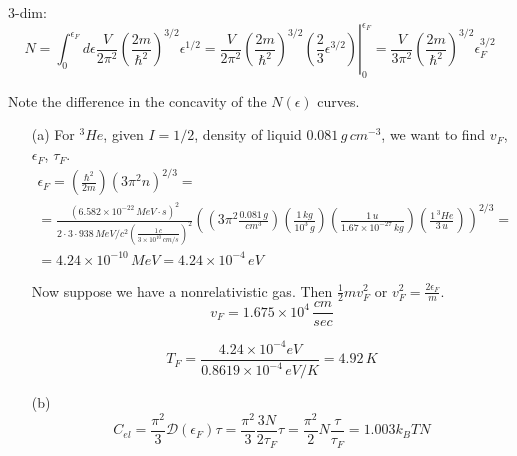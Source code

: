 \documentclass[twoside]{amsart}
\theoremstyle{plain}
\theoremstyle{definition}
\newcommand{\solutionhead}[1]
  {
   \noindent{\small\bf Solution #1.}
   }
\begin{document}
3-dim:
\[
N = \int_0^{\epsilon_F} d\epsilon \frac{V}{2\pi^2} \left( \frac{2m}{ \hbar^2} \right)^{3/2} \epsilon^{1/2} = \left. \frac{V}{2\pi^2} \left( \frac{2m}{ \hbar^2} \right)^{3/2} \left( \frac{2}{3} \epsilon^{3/2} \right) \right|_0^{\epsilon_F} = \frac{V}{3\pi^2} \left( \frac{2m}{ \hbar^2 }\right)^{3/2} \epsilon_F^{3/2}
\]

Note the difference in the concavity of the $N(\epsilon)$ curves.

\solutionhead{5}
\begin{itemize}
\item[(a)] For $^{3}He$, given $I = 1/2$, density of liquid $0.081 \, g \, cm^{-3}$, we want to find $v_F$, $\epsilon_F$, $\tau_F$.  
\[
\begin{gathered}
  \epsilon_F = \left( \frac{ \hbar^2}{ 2m} \right) (3\pi^2 n)^{2/3} = \\
  = \frac{ (6.582 \times 10^{-22} \, MeV \cdot s )^2 }{ 2 \cdot 3 \cdot 938 \, MeV/c^2 \left( \frac{1 \, c}{ 3\times 10^{10} \, cm/s } \right)^2 } \left( \left( 3 \pi^2 \frac{ 0.081 \, g }{cm^3} \right) \left( \frac{1 \, kg}{ 10^3 \, g} \right) \left( \frac{1 \, u }{ 1.67 \times 10^{-27} \, kg } \right) \left( \frac{ 1 \, ^{3}He}{ 3 \, u } \right) \right)^{2/3} = \\
  = 4.24 \times 10^{-10} \, MeV = 4.24 \times 10^{-4} \, eV
\end{gathered}
\]

Now suppose we have a nonrelativistic gas.  Then $\frac{1}{2} m v_F^2$ or $v_F^2 = \frac{2\epsilon_F}{m}$.
\[
v_F = 1.675 \times 10^4 \, \frac{cm}{sec}
\]

\[
T_F  = \frac{4.24 \times 10^{-4 } eV}{ 0.8619 \times 10^{-4} \, eV/K } = 4.92 \, K
\]
\item[(b)] 
\[
C_{el} = \frac{\pi^2}{3} \mathcal{D}(\epsilon_F)\tau = \frac{\pi^2}{3} \frac{3N}{2\tau_F} \tau = \frac{\pi^2}{2} N \frac{\tau}{\tau_F} = 1.003 k_B T N
\]
\end{itemize}
\end{document}
